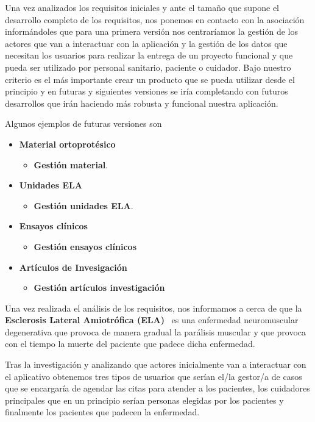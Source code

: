 Una vez analizados los requisitos iniciales y ante el tamaño que supone el desarrollo completo de los requisitos, nos ponemos en contacto con la asociación informándoles que para una primera versión nos centraríamos la gestión de los actores que van a interactuar con la aplicación y la gestión de los datos que necesitan los usuarios para realizar la entrega de un proyecto funcional y que pueda ser utilizado por personal sanitario, paciente o cuidador. 
Bajo nuestro criterio es el más importante crear un producto que se pueda utilizar desde el principio y en futuras y siguientes versiones se iría completando con futuros desarrollos que irán haciendo más robusta y funcional nuestra aplicación.

Algunos ejemplos de futuras versiones son 
\begin{itemize}
\item \textbf{Material ortoprotésico}
			\begin{itemize}
				\item \textbf{Gestión material}.
			\end{itemize}
\item \textbf{Unidades ELA}
			\begin{itemize}
				\item \textbf{Gestión unidades ELA}.
			\end{itemize}
\item \textbf{Ensayos clínicos}
			\begin{itemize}
				\item \textbf{Gestión ensayos clínicos}
			\end{itemize}
\item \textbf{Artículos de Invesigación}
			\begin{itemize}
				\item \textbf{Gestión artículos investigación}
			\end{itemize}
\end{itemize}
Una vez realizada el análisis de los requisitos, nos informamos a cerca de que la \textbf{Esclerosis Lateral Amiotrófica (ELA)}~\cite{wiki:ela} es una enfermedad neuromuscular degenerativa que provoca de manera gradual la parálisis muscular y que provoca con el tiempo la muerte del paciente que padece dicha enfermedad.

Tras la investigación y analizando que actores inicialmente van a interactuar con el aplicativo obtenemos tres tipos de usuarios que serían el/la gestor/a de casos que se encargaría de agendar las citas para atender a los pacientes, los cuidadores principales que en un principio serían personas elegidas por los pacientes y finalmente los pacientes que padecen la enfermedad.



